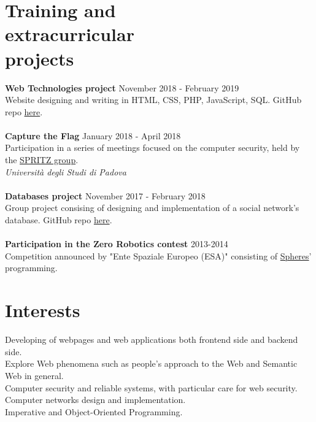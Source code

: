 \documentclass[margin, 10pt]{res}
\begin{document}
\begin{resume}

\section{Training and\\ extracurricular \\ projects}
\textbf{Web Technologies project} \hfill November 2018 - February 2019 \\
Website designing and writing in HTML, CSS, PHP, JavaScript, SQL. GitHub repo \href{https://github.com/enricobu96/TecWebUNIPD}{here}.\\ \\
\textbf{Capture the Flag} \hfill January 2018 - April 2018 \\
Participation in a series of meetings focused on the computer security, held by the \href{https://github.com/enricobu96/TecWebUNIPD}{SPRITZ group}. \\
\textit{Università degli Studi di Padova} \\ \\
\textbf{Databases project} \hfill November 2017 - February 2018 \\
Group project consising of designing and implementation of a social network's database. GitHub repo \href{https://github.com/enricobu96/DB1718}{here}. \\ \\
\textbf{Participation in the Zero Robotics contest} \hfill 2013-2014 \\
Competition announced by "Ente Spaziale Europeo (ESA)" consisting of \href{https://www.esa.int/Science_Exploration/Human_and_Robotic_Exploration/Education/Robot_Spheres_in_zero-gravity_action}{Spheres}' programming.


\section{Interests}
Developing of webpages and web applications both frontend side and backend side. \\
Explore Web phenomena such as people's approach to the Web and Semantic Web in general. \\
Computer security and reliable systems, with particular care for web security. \\
Computer networks design and implementation. \\
Imperative and Object-Oriented Programming. \\




\end{resume}
\end{document}
